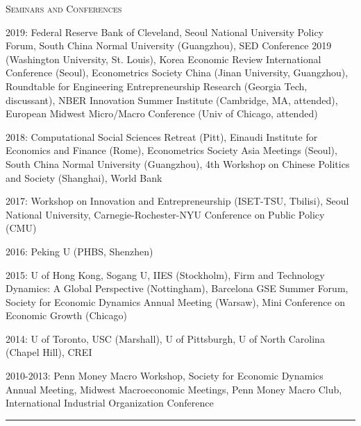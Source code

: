 \documentclass{article}
\begin{document}
\parbox{\textwidth}{
\parbox[t]{0.28\textwidth}{ \raggedright \noindent \textsc{ Seminars and Conferences } }
\parbox[t]{0.72\textwidth}{ \raggedright

2019: Federal Reserve Bank of Cleveland, Seoul National University Policy Forum, South China Normal University (Guangzhou), SED Conference 2019 (Washington University, St. Louis), Korea Economic Review International Conference (Seoul), Econometrics Society China (Jinan University, Guangzhou), Roundtable for Engineering Entrepreneurship Research (Georgia Tech, discussant), NBER Innovation Summer Institute (Cambridge, MA, attended), European Midwest Micro/Macro Conference (Univ of Chicago, attended)
\vspace{0.27cm}

2018: Computational Social Sciences Retreat (Pitt), Einaudi Institute for Economics and Finance (Rome), Econometrics Society Asia Meetings (Seoul), South China Normal University (Guangzhou), 4th Workshop on Chinese Politics and Society (Shanghai), World Bank
\vspace{0.27cm}

2017: Workshop on Innovation and Entrepreneurship (ISET-TSU, Tbilisi), Seoul National University, Carnegie-Rochester-NYU Conference on Public Policy (CMU)
\vspace{0.27cm}

2016: Peking U (PHBS, Shenzhen)
\vspace{0.27cm}

2015: U of Hong Kong, Sogang U, IIES (Stockholm), Firm and Technology Dynamics: A Global Perspective (Nottingham), Barcelona GSE Summer Forum, Society for Economic Dynamics Annual Meeting (Warsaw), Mini Conference on Economic Growth (Chicago)
\vspace{0.27cm}

2014: U of Toronto, USC (Marshall), U of Pittsburgh, U of North Carolina (Chapel Hill), CREI
\vspace{0.27cm}

2010-2013: Penn Money Macro Workshop, Society for Economic Dynamics Annual Meeting, Midwest Macroeconomic Meetings, Penn Money Macro Club, International Industrial Organization Conference
\vspace{0.27cm}

}
\textcolor{light-gray}{\hrule}
}
\vspace{0.3cm}
\end{document}
